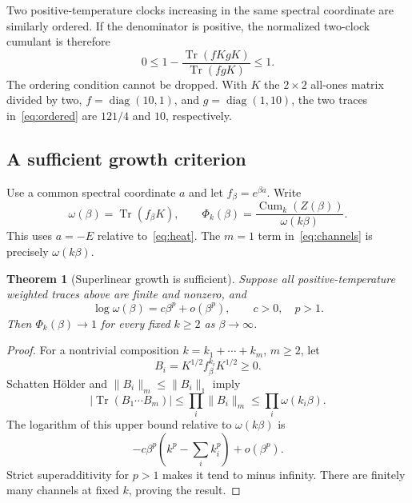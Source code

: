 \documentclass[11pt,a4paper]{article}
\newtheorem{theorem}{Theorem}[section]
\theoremstyle{remark}\newtheorem{remark}[theorem]{Remark}
\newcommand{\Tr}{\operatorname{Tr}}
\newcommand{\Cum}{\operatorname{Cum}}
\begin{document}
Two positive-temperature clocks increasing in the same spectral coordinate are similarly ordered.
If the denominator is positive, the normalized two-clock cumulant is therefore
\begin{equation}
 0\le 1-\frac{\Tr(fKgK)}{\Tr(fgK)}\le1.
\end{equation}
The ordering condition cannot be dropped.
With $K$ the $2\times2$ all-ones matrix divided by two, $f=\operatorname{diag}(10,1)$, and $g=\operatorname{diag}(1,10)$, the two traces in~\eqref{eq:ordered} are $121/4$ and $10$, respectively.

\subsection{A sufficient growth criterion}
Use a common spectral coordinate $a$ and let $f_\beta=e^{\beta a}$.
Write
\begin{equation}
 \omega(\beta)=\Tr(f_\beta K),\qquad
 \Phi_k(\beta)=\frac{\Cum_k(Z(\beta))}{\omega(k\beta)}.
\end{equation}
This uses $a=-E$ relative to~\eqref{eq:heat}.
The $m=1$ term in~\eqref{eq:channels} is precisely $\omega(k\beta)$.

\begin{theorem}[Superlinear growth is sufficient]\label{thm:condensation}
Suppose all positive-temperature weighted traces above are finite and nonzero, and
\begin{equation}\label{eq:growth}
 \log\omega(\beta)=c\beta^p+o(\beta^p),\qquad c>0,\quad p>1.
\end{equation}
Then $\Phi_k(\beta)\to1$ for every fixed $k\ge2$ as $\beta\to\infty$.
\end{theorem}
\begin{proof}
For a nontrivial composition $k=k_1+\cdots+k_m$, $m\ge2$, let
\begin{equation}
 B_i=K^{1/2}f_\beta^{k_i}K^{1/2}\ge0.
\end{equation}
Schatten H\"older and $\|B_i\|_m\le\|B_i\|_1$ imply
\begin{equation}
 |\Tr(B_1\cdots B_m)|\le\prod_i\|B_i\|_m
 \le\prod_i\omega(k_i\beta).
\end{equation}
The logarithm of this upper bound relative to $\omega(k\beta)$ is
\begin{equation}
 -c\beta^p\left(k^p-\sum_i k_i^p\right)+o(\beta^p).
\end{equation}
Strict superadditivity for $p>1$ makes it tend to minus infinity.
There are finitely many channels at fixed $k$, proving the result.
\end{proof}
\end{document}
